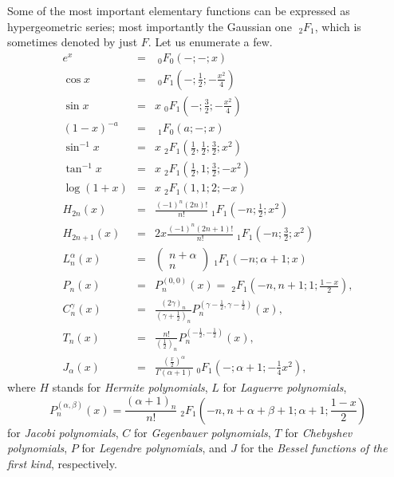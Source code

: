 Some of the most important elementary functions can be expressed as hypergeometric series; most importantly the Gaussian one ${\;}_2F_1$,
which is
sometimes denoted by just $F$.
Let us enumerate a few.
\begin{eqnarray}
e^x
&=&
{\;}_0F_0(-;-;x)
\\
\cos x
&=&
{\;}_0F_1(-;\frac{1}{2};-\frac{x^2}{4})
\\
\sin x
&=&
x
{\;}_0F_1(-;\frac{3}{2};-\frac{x^2}{4})
\\
(1-x)^{-a}
&=&
{\;}_1F_0(a;-  ;x)
\\
\sin^{-1} x
&=&
x
{\;}_2F_1(\frac{1}{2},\frac{1}{2};\frac{3}{2};x^2)
\\
\tan^{-1} x
&=&
x
{\;}_2F_1(\frac{1}{2},1;\frac{3}{2};-x^2)
\\
\log (1 + x)
&=&
x
{\;}_2F_1(1,1;2;-x)
\\
H_{2n}(x)
&=&
\frac{(-1)^n(2n)!}{n!}
{\;}_1F_1(-n;\frac{1}{2}; x^2)
\\
H_{2n+1}(x)
&=&
2x
\frac{(-1)^n(2n+1)!}{n!}
{\;}_1F_1(-n;\frac{3}{2}; x^2)
\\
L_{n}^\alpha (x)
&=&
\left(
\begin{array}{c}
n+\alpha\\
n
\end{array}
\right)
{\;}_1F_1(-n;\alpha +1; x)
\\
P_{n}(x)
&=&   P^{(0, 0 )}_n (x)
=
{\;}_2F_1(-n,n+1; 1;\frac{1- x}{2}) ,
\\
C_{n}^\gamma (x)
&=& \frac{(2\gamma )_n}{\left( \gamma +\frac{1}{2}\right)_n}  P^{(\gamma -\frac{1}{2}, \gamma -\frac{1}{2} )}_n (x)
 ,
\\
T_{n}  (x)
&=& \frac{n!}{\left(  \frac{1}{2}\right)_n}  P^{( -\frac{1}{2},  -\frac{1}{2} )}_n (x)
,
\\
J_{\alpha }  (x)
&=& \frac{\left(\frac{x}{2}\right)^\alpha }{\Gamma (\alpha +1)}
{\;}_0F_1(- ; \alpha +1;-\frac{1 }{4}x^2) ,
\end{eqnarray}
where
$H$ stands for
{\em Hermite polynomials},
$L$ for
{\em Laguerre polynomials},
\begin{equation}
P^{(\alpha, \beta )}_n (x)
=\frac{(\alpha +1)_n}{n!} {\;}_2F_1(-n,n+\alpha +\beta +1; \alpha +1;\frac{1- x}{2})
\end{equation}
for
{\em Jacobi polynomials},
$C$ for
{\em Gegenbauer polynomials},
$T$ for
{\em Chebyshev polynomials},
$P$  for
{\em Legendre polynomials},
and
$J$  for   the
{\em Bessel functions of the first kind},
respectively.

